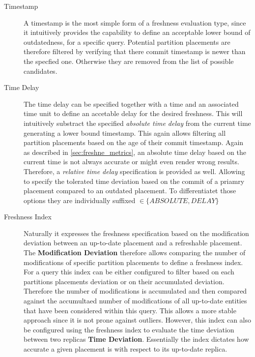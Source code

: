 \begin{description}
    \item[Timestamp] A timestamp is the most simple form of a freshness evaluation type, since it intuitively provides the capability to define 
    an acceptable lower bound of outdatedness, for a specific query. Potential partition placements are therefore filtered by verifying that there commit timestamp is newer
    than the specfied one. Otherwise they are removed from the list of possible candidates.
    
    \item[Time Delay]
    The time delay can be specified together with a time and an associated time unit to define an accetable delay for the desired freshness. 
    This will intuitively substract the specified \emph{absolute time delay} from the current time generating a lower bound timestamp. 
    This again allows filtering all partition placements based on the age of their commit timestamp.
    Again as described in \ref{sec:freshne_metrics}, an absolute time delay based on the current time is not always accurate or might even render wrong results.
    Therefore, a \emph{relative time delay} specification is provided as well. Allowing to specify the tolerated time deviation based on the commit of a priamry placement 
    compared to an outdated placement. To differentiatet those options they are individually suffixed $\in \{ABSOLUTE, DELAY\}$

    \item[Freshness Index]
    Naturally it expresses the freshness specification based on the modification deviation between an up-to-date placement
    and a refreshable placement. The \textbf{Modification Deviation} therefore allows comparing the number of modifications of specific partition placements
    to define a freshness index. For a query this index can be either configured to filter based on each partitions placements deviation or on their accumulated deviation.
    Therefore the number of modifications is accumulated and then compared against the accumultaed number of modifications 
    of all up-to-date entities that have been considered within this query. This allows a more stable approach since it is not prone against outliers. 
    However, this index can also be configured using the freshness index to evaluate the time deviation between two replicas \textbf{Time Deviation}. 
    Essentially the index dictates how accurate a given placement is with respect to its up-to-date replica.
    
\end{description}


